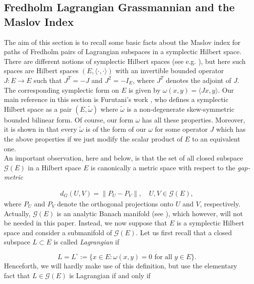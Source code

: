 \documentclass[a4paper,10pt]{article}
\begin{document}
\subsection{Fredholm Lagrangian Grassmannian and the Maslov Index}\label{subsection-Maslov}
The aim of this section is to recall some basic facts about the Maslov index for paths of Fredholm pairs of Lagrangian subspaces in a symplectic Hilbert space. There are different notions of symplectic Hilbert spaces (see e.g. \cite{BoossZhuII}), but here such spaces are Hilbert spaces $(E,\langle\cdot,\cdot\rangle)$ with an invertible bounded operator $J:E\rightarrow E$ such that $J^T=-J$ and $J^2=-I_E$, where $J^T$ denotes the adjoint of $J$. The corresponding symplectic form on $E$ is given by $\omega(x,y)=\langle Jx,y\rangle$. Our main reference in this section is Furutani's work \cite{Furutani}, who defines a symplectic Hilbert space as a pair $(E,\widetilde{\omega})$ where $\widetilde{\omega}$ is a non-degenerate skew-symmetric bounded bilinear form. Of course, our form $\omega$ has all these properties. Moreover, it is shown in \cite{Furutani} that every $\widetilde{\omega}$ is of the form of our $\omega$ for some operator $J$ which has the above properties if we just modify the scalar product of $E$ to an equivalent one.\\
An important observation, here and below, is that the set of all closed subspace $\mathcal{G}(E)$ in a Hilbert space $E$ is canonically a metric space with respect to the \textit{gap-metric}

\begin{align}\label{gap-subspaces}
d_G(U,V)=\|P_U-P_V\|,\quad U,V\in\mathcal{G}(E),
\end{align}
where $P_U$ and $P_V$ denote the orthogonal projections onto $U$ and $V$, respectively. Actually, $\mathcal{G}(E)$ is an analytic Banach manifold (see \cite{AbbondandoloMajerGrass}), which however, will not be needed in this paper. Instead, we now suppose that $E$ is a symplectic Hilbert space and consider a submanifold of $\mathcal{G}(E)$. Let us first recall that a closed subspace $L\subset E$ is called \textit{Lagrangian} if  

\[L=L^\circ:=\{x\in E:\omega(x,y)=0\text{ for all } y\in E\}.\]
Henceforth, we will hardly make use of this definition, but use the elementary fact that $L\in\mathcal{G}(E)$ is Lagrangian if and only if
\end{document}

